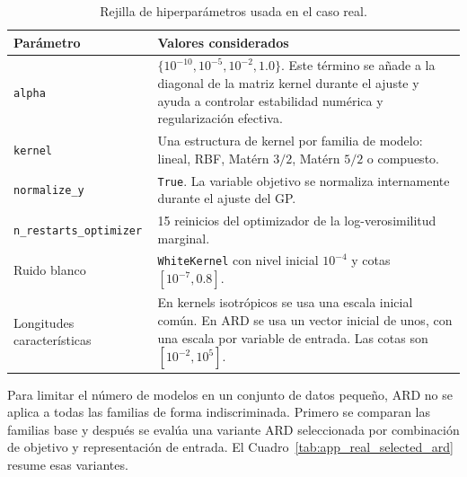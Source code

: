 \begin{table}[htbp]
\centering
\small
\caption[Rejilla de hiperparámetros del caso real]{Rejilla de hiperparámetros usada en el caso real.}
\label{tab:app_real_gp_grid}
\renewcommand{\arraystretch}{1.15}
\begin{tabularx}{\textwidth}{@{}p{4.2cm}X@{}}
\toprule
\textbf{Parámetro} & \textbf{Valores considerados} \\
\midrule
\texttt{alpha} &
\(\{10^{-10},10^{-5},10^{-2},1.0\}\). Este término se añade a la diagonal de la matriz kernel durante el ajuste y ayuda a controlar estabilidad numérica y regularización efectiva. \\

\texttt{kernel} &
Una estructura de kernel por familia de modelo: lineal, RBF, Matérn \(3/2\), Matérn \(5/2\) o compuesto. \\

\texttt{normalize\_y} &
\texttt{True}. La variable objetivo se normaliza internamente durante el ajuste del GP. \\

\texttt{n\_restarts\_optimizer} &
15 reinicios del optimizador de la log-verosimilitud marginal. \\

Ruido blanco &
\texttt{WhiteKernel} con nivel inicial \(10^{-4}\) y cotas \([10^{-7},0.8]\). \\

Longitudes características &
En kernels isotrópicos se usa una escala inicial común. En ARD se usa un vector inicial de unos, con una escala por variable de entrada. Las cotas son \([10^{-2},10^{5}]\). \\
\bottomrule
\end{tabularx}
\end{table}
\FloatBarrier

Para limitar el número de modelos en un conjunto de datos pequeño, ARD no se aplica a todas las familias de forma indiscriminada. Primero se comparan las familias base y después se evalúa una variante ARD seleccionada por combinación de objetivo y representación de entrada. El Cuadro~\ref{tab:app_real_selected_ard} resume esas variantes.

